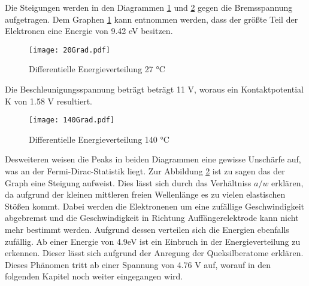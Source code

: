 Die Steigungen werden in den Diagrammen \ref{fig:Energie20} und \ref{fig:Energie140} gegen die Bremsspannung aufgetragen. Dem Graphen \ref{fig:Energie20} kann entnommen werden, dass der größte Teil der Elektronen eine Energie von 9.42 eV besitzen.
\begin{figure}
  \centering
  \texttt{[image: 20Grad.pdf]}
  \caption{Differentielle Energieverteilung 27 °C}
  \label{fig:Energie20}
\end{figure}
Die Beschleunigungsspannung beträgt beträgt 11 V, woraus ein Kontaktpotential K von 1.58 V resultiert.
\begin{figure}
  \centering
  \texttt{[image: 140Grad.pdf]}
  \caption{Differentielle Energieverteilung 140 °C}
  \label{fig:Energie140}
\end{figure}
Desweiteren weisen die Peaks in beiden Diagrammen eine gewisse Unschärfe auf, was an der Fermi-Dirac-Statistik liegt. Zur Abbildung \ref{fig:Energie140} ist zu sagen das der Graph eine Steigung aufweist. Dies lässt sich durch das Verhältniss $a/w$ erklären, da aufgrund der kleinen mittleren freien Wellenlänge es zu vielen elastischen Stößen kommt. Dabei werden die Elektronenen um eine zufällige Geschwindigkeit abgebremst und die Geschwindigkeit in Richtung Auffängerelektrode kann nicht mehr bestimmt werden. Aufgrund dessen verteilen sich die Energien ebenfalls zufällig. Ab einer Energie von 4.9eV ist ein Einbruch in der Energieverteilung zu erkennen. Dieser lässt sich aufgrund der Anregung der Queksilberatome erklären. Dieses Phänomen tritt ab einer Spannung von 4.76 V auf, worauf in den folgenden Kapitel noch weiter eingegangen wird.

